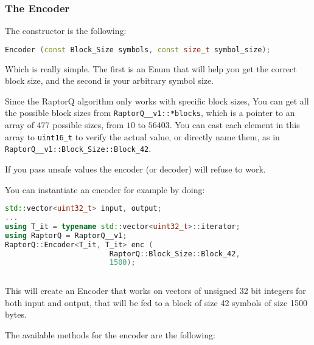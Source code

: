 \documentclass[11pt,a4paper]{refart}
\begin{document}
\subsubsection{The Encoder}
The constructor is the following:
\begin{lstlisting}[language=C++]
Encoder (const Block_Size symbols, const size_t symbol_size);
\end{lstlisting}

Which is really simple. The first is an Enum that will help you get the correct block size, and the second is your arbitrary symbol size.

Since the RaptorQ algorithm only works with specific block sizes, You can get all the possible block sizes from \texttt{RaptorQ\_\_v1::*blocks}, which is a pointer to an array of 477 possible sizes, from $10$ to $56403$. You can cast each element in this array to \texttt{uint16\_t} to verify the actual value, or directly name them, as in \texttt{RaptorQ\_\_v1::Block\_Size::Block\_42}.

If you pass unsafe values the encoder (or decoder) will refuse to work.

You can instantiate an encoder for example by doing:

\begin{lstlisting}[language=C++]
std::vector<uint32_t> input, output;
...
using T_it = typename std::vector<uint32_t>::iterator;
using RaptorQ = RaptorQ__v1;
RaptorQ::Encoder<T_it, T_it> enc (
						RaptorQ::Block_Size::Block_42,					
						1500);
														
\end{lstlisting}

This will create an Encoder that works on vectors of unsigned 32 bit integers for both input and output, that will be fed to a block of size 42 
symbols of size 1500 bytes.

The available methods for the encoder are the following:
\end{document}
